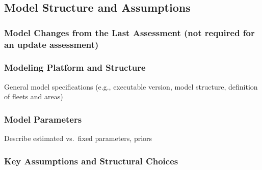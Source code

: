 \documentclass[11pt,
  english,
  a4paper,
]{article}
\begin{document}
\leavevmode\tagmcend\tagstructend


\hypertarget{model-structure-and-assumptions}{%
\subsection{Model Structure and Assumptions}\label{model-structure-and-assumptions}}

\leavevmode\tagmcend\tagstructend


\hypertarget{model-changes-from-the-last-assessment-not-required-for-an-update-assessment}{%
\subsubsection{Model Changes from the Last Assessment (not required for an update assessment)}\label{model-changes-from-the-last-assessment-not-required-for-an-update-assessment}}

\leavevmode\tagmcend\tagstructend


\hypertarget{modeling-platform-and-structure}{%
\subsubsection{Modeling Platform and Structure}\label{modeling-platform-and-structure}}

\leavevmode\tagmcend\tagstructend

General model specifications (e.g., executable version, model structure, definition of fleets and areas)


\hypertarget{model-parameters}{%
\subsubsection{Model Parameters}\label{model-parameters}}

\leavevmode\tagmcend\tagstructend

Describe estimated vs.~fixed parameters, priors


\hypertarget{key-assumptions-and-structural-choices}{%
\subsubsection{Key Assumptions and Structural Choices}\label{key-assumptions-and-structural-choices}}
\end{document}
